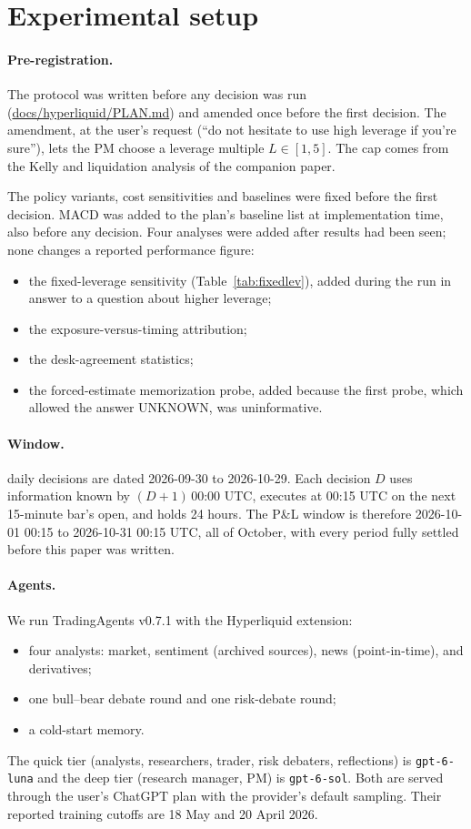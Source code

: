 \section{Experimental setup}\label{sec:setup}

\paragraph{Pre-registration.} The protocol was written before any decision was run (\url{docs/hyperliquid/PLAN.md}) and amended once before the first decision. The amendment, at the user's request (``do not hesitate to use high leverage if you're sure''), lets the PM choose a leverage multiple $L\in[1,5]$. The cap comes from the Kelly and liquidation analysis of the companion paper.

The policy variants, cost sensitivities and baselines were fixed before the first decision. MACD was added to the plan's baseline list at implementation time, also before any decision. Four analyses were added after results had been seen; none changes a reported performance figure:
\begin{itemize}
\item the fixed-leverage sensitivity (Table~\ref{tab:fixedlev}), added during the run in answer to a question about higher leverage;
\item the exposure-versus-timing attribution;
\item the desk-agreement statistics;
\item the forced-estimate memorization probe, added because the first probe, which allowed the answer UNKNOWN, was uninformative.
\end{itemize}

\paragraph{Window.} \Decisions{} daily decisions are dated 2026-09-30 to 2026-10-29. Each decision $D$ uses information known by $(D+1)\,$00:00 UTC, executes at 00:15 UTC on the next 15-minute bar's open, and holds 24 hours. The P\&L window is therefore 2026-10-01 00:15 to 2026-10-31 00:15 UTC, all of October, with every period fully settled before this paper was written.

\paragraph{Agents.} We run TradingAgents v0.7.1 with the Hyperliquid extension:
\begin{itemize}
\item four analysts: market, sentiment (archived sources), news (point-in-time), and derivatives;
\item one bull--bear debate round and one risk-debate round;
\item a cold-start memory.
\end{itemize}
The quick tier (analysts, researchers, trader, risk debaters, reflections) is \texttt{gpt-6-luna} and the deep tier (research manager, PM) is \texttt{gpt-6-sol}. Both are served through the user's ChatGPT plan with the provider's default sampling. Their reported training cutoffs are 18 May and 20 April 2026.

